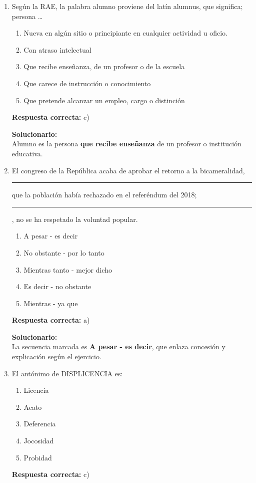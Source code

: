 \begin{enumerate}

	
	\item Según la RAE, la palabra alumno proviene del latín alumnus, que significa; persona …
	\begin{enumerate}[label=\alph*)]
		\item Nueva en algún sitio o principiante en cualquier actividad u oficio.
		\item Con atraso intelectual
		\item Que recibe enseñanza, de un profesor o de la escuela
		\item Que carece de instrucción o conocimiento
		\item Que pretende alcanzar un empleo, cargo o distinción
	\end{enumerate}
	\textbf{Respuesta correcta:} c)
	
	\vspace{2mm}
	\textbf{Solucionario:}\\
	Alumno es la persona \textbf{que recibe enseñanza} de un profesor o institución educativa.
	
	\vspace{6mm}
	
	\item El congreso de la República acaba de aprobar el retorno a la bicameralidad, \rule{2cm}{0.4pt} que la población había rechazado en el referéndum del 2018; \rule{2cm}{0.4pt}, no se ha respetado la voluntad popular.
	\begin{enumerate}[label=\alph*)]
		\item A pesar - es decir
		\item No obstante - por lo tanto
		\item Mientras tanto - mejor dicho
		\item Es decir - no obstante
		\item Mientras - ya que
	\end{enumerate}
	\textbf{Respuesta correcta:} a)
	
	\vspace{2mm}
	\textbf{Solucionario:}\\
	La secuencia marcada es \textbf{A pesar - es decir}, que enlaza concesión y explicación según el ejercicio.
	
	\vspace{6mm}
	
	\item El antónimo de DISPLICENCIA es:
	\begin{enumerate}[label=\alph*)]
		\item Licencia
		\item Acato
		\item Deferencia
		\item Jocosidad
		\item Probidad
	\end{enumerate}
	\textbf{Respuesta correcta:} c)
	

\end{enumerate}
